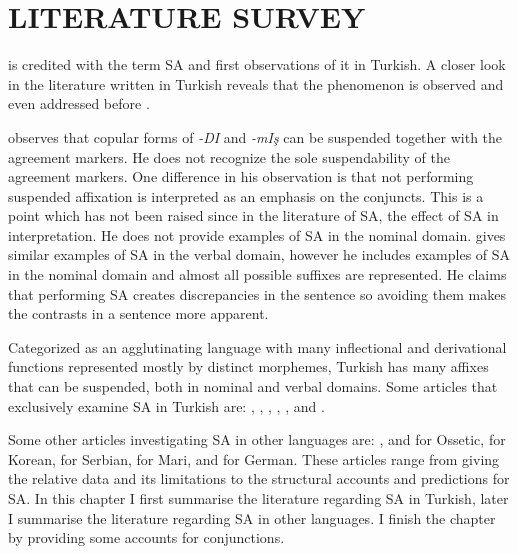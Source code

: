 \chapter{\MakeUppercase{literature survey}} \label{litsurvey}


\cite{geoffrey1967turkish} is credited with the term SA and first observations of it in Turkish. A closer look in the literature written in Turkish reveals that the phenomenon is observed and even addressed before \citep{emre1945turk,gencan1966dilbilgisi}.

\citet[par 219]{emre1945turk} observes that copular forms of \textit{-DI} and \textit{-mIş} can be suspended together with the agreement markers. He does not recognize the sole suspendability of the agreement markers. One difference in his observation is that not performing suspended affixation is interpreted as an emphasis on the conjuncts. This is a point which has not been raised since in the literature of SA, the effect of SA in interpretation. He does not provide examples of SA in the nominal domain. \citet[par 382]{gencan1966dilbilgisi} gives similar examples of SA in the verbal domain, however he includes examples of SA in the nominal domain and almost all possible suffixes are represented. He claims that performing SA creates discrepancies in the sentence so avoiding them makes the contrasts in a sentence more apparent.  

Categorized as an agglutinating language with many inflectional and derivational functions represented mostly by distinct morphemes, Turkish has many affixes that can be suspended, both in nominal and verbal domains. Some articles that exclusively examine SA in Turkish are: \cite{orgun1995flat}, \cite{kabak2007turkish}, \cite{broadwell2008turkish}, \cite{kornfilt2012revisiting}, \cite{kharytonava2012word,kharytonava2012taming}, and \cite{akkucs2016suspended}.

Some other articles investigating SA in other languages are: \cite{erschler2012suspended}, and \cite{erschler2018suspended} for Ossetic, \cite{yoon2017lexical} for Korean, \cite{despic2017suspended} for Serbian, \cite{guseva2017postsyntactic} for Mari, and \cite{pounder2006broken} for German. These articles range from giving the relative data and its limitations to the structural accounts and predictions for SA. In this chapter I first summarise the literature regarding SA in Turkish, later I summarise the literature regarding SA in other languages. I finish the chapter by providing some accounts for conjunctions.


